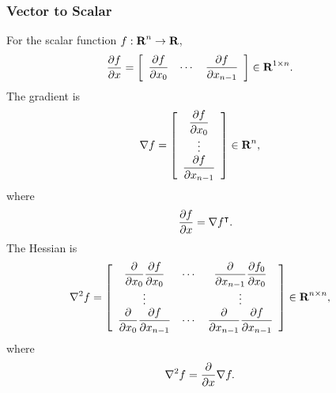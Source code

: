 \documentclass{article}
\begin{document}
    \subsubsection{Vector to Scalar}
        For the scalar function $f:\textbf{R}^n\to\textbf{R}$,
        \begin{align*}
            \frac{\partial f}{\partial x}&=\left[\begin{array}{ccc}
            \dfrac{\partial f}{\partial x_0} & \cdots & \dfrac{\partial f}{\partial x_{n-1}}
            \end{array}\right]\in\textbf{R}^{1\times n}.
        \end{align*}
        The gradient is 
        \begin{align*}
            \nabla f&=\left[\begin{array}{c}
            \dfrac{\partial f}{\partial x_0}\\
            \vdots\\
            \dfrac{\partial f}{\partial x_{n-1}}
            \end{array}\right]\in\textbf{R}^n,
        \end{align*}
        where
        \begin{align*}
            \frac{\partial f}{\partial x} = \nabla f^\intercal.
        \end{align*}
        The Hessian is 
        \begin{align*}
            \nabla^2 f&=\left[\begin{array}{ccc}
            \dfrac{\partial }{\partial x_0}\dfrac{\partial f}{\partial x_0} & \cdots & \dfrac{\partial }{\partial x_{n-1}}\dfrac{\partial f_0}{\partial x_0}\\
            \vdots & & \vdots\\
            \dfrac{\partial }{\partial x_0}\dfrac{\partial f}{\partial x_{n-1}} & \cdots & \dfrac{\partial }{\partial x_{n-1}}\dfrac{\partial f}{\partial x_{n-1}}
            \end{array}\right]\in\textbf{R}^{n\times n},
        \end{align*}
        where
        \begin{align*}
            \nabla^2 f &= \frac{\partial }{\partial x}\nabla f.
        \end{align*}
    
\end{document}
